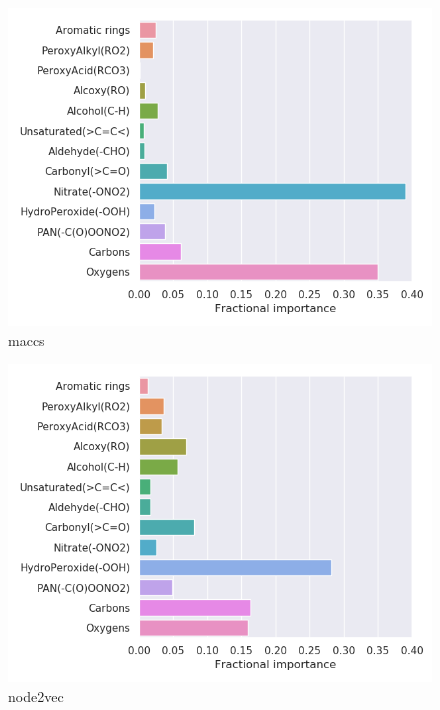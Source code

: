 \begin{subfigure}[b]{0.5\textwidth}
    \centering
    \includegraphics[width=\textwidth]{outputs/AE/maccs/legend.png}
    \caption{maccs}
    \label{fig:legend_AE_maccs}
\end{subfigure}
\begin{subfigure}[b]{0.5\textwidth}
    \centering
    \includegraphics[width=\textwidth]{outputs/AE/node2vec/legend.png}
    \caption{node2vec}
    \label{fig:legend_AE_node2vec}
\end{subfigure}
